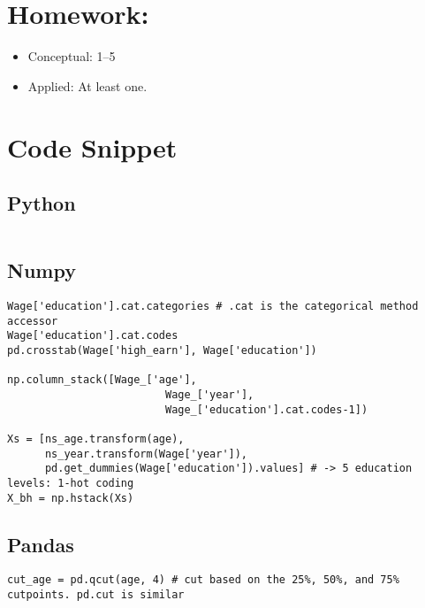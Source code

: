 \documentclass[
  letterpaper,
  DIV=11,
  numbers=noendperiod]{scrreprt}
\providecommand{\tightlist}{%
  \setlength{\itemsep}{0pt}\setlength{\parskip}{0pt}}\usepackage{longtable,booktabs,array}
\begin{document}
\section{Homework:}\label{homework-3}

\begin{itemize}
\tightlist
\item
  Conceptual: 1--5
\item
  Applied: At least one.
\end{itemize}

\section{Code Snippet}\label{code-snippet-1}

\subsection{Python}\label{python-5}

\begin{verbatim}

\end{verbatim}

\subsection{Numpy}\label{numpy-5}

\begin{verbatim}
Wage['education'].cat.categories # .cat is the categorical method accessor
Wage['education'].cat.codes
pd.crosstab(Wage['high_earn'], Wage['education'])

np.column_stack([Wage_['age'],
                         Wage_['year'],
                         Wage_['education'].cat.codes-1])

Xs = [ns_age.transform(age),
      ns_year.transform(Wage['year']),
      pd.get_dummies(Wage['education']).values] # -> 5 education levels: 1-hot coding
X_bh = np.hstack(Xs)
\end{verbatim}

\subsection{Pandas}\label{pandas-5}

\begin{verbatim}
cut_age = pd.qcut(age, 4) # cut based on the 25%, 50%, and 75% cutpoints. pd.cut is similar
\end{verbatim}
\end{document}
